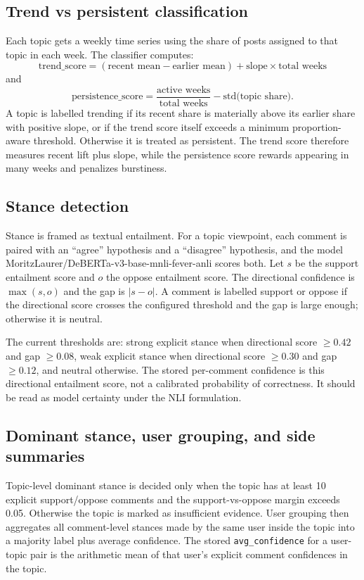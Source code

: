 \documentclass[11pt]{article}
\begin{document}
        \subsection*{Trend vs persistent classification}
        Each topic gets a weekly time series using the share of posts assigned to that topic in each week. The classifier computes:
        \[
        \text{trend\_score} = (\text{recent mean} - \text{earlier mean}) + \text{slope} \times \text{total weeks}
        \]
        and
        \[
        \text{persistence\_score} = \frac{\text{active weeks}}{\text{total weeks}} - \text{std(topic share)}.
        \]
        A topic is labelled trending if its recent share is materially above its earlier share with positive slope, or if the trend score itself exceeds a minimum proportion-aware threshold. Otherwise it is treated as persistent. The trend score therefore measures recent lift plus slope, while the persistence score rewards appearing in many weeks and penalizes burstiness.

        \subsection*{Stance detection}
        Stance is framed as textual entailment. For a topic viewpoint, each comment is paired with an ``agree'' hypothesis and a ``disagree'' hypothesis, and the model MoritzLaurer/DeBERTa-v3-base-mnli-fever-anli scores both. Let $s$ be the support entailment score and $o$ the oppose entailment score. The directional confidence is $\max(s,o)$ and the gap is $|s-o|$. A comment is labelled support or oppose if the directional score crosses the configured threshold and the gap is large enough; otherwise it is neutral.

        The current thresholds are: strong explicit stance when directional score $\geq 0.42$ and gap $\geq 0.08$, weak explicit stance when directional score $\geq 0.30$ and gap $\geq 0.12$, and neutral otherwise. The stored per-comment confidence is this directional entailment score, not a calibrated probability of correctness. It should be read as model certainty under the NLI formulation.

        \subsection*{Dominant stance, user grouping, and side summaries}
        Topic-level dominant stance is decided only when the topic has at least 10 explicit support/oppose comments and the support-vs-oppose margin exceeds 0.05. Otherwise the topic is marked as insufficient evidence. User grouping then aggregates all comment-level stances made by the same user inside the topic into a majority label plus average confidence. The stored \texttt{avg\_confidence} for a user-topic pair is the arithmetic mean of that user's explicit comment confidences in the topic.
\end{document}
